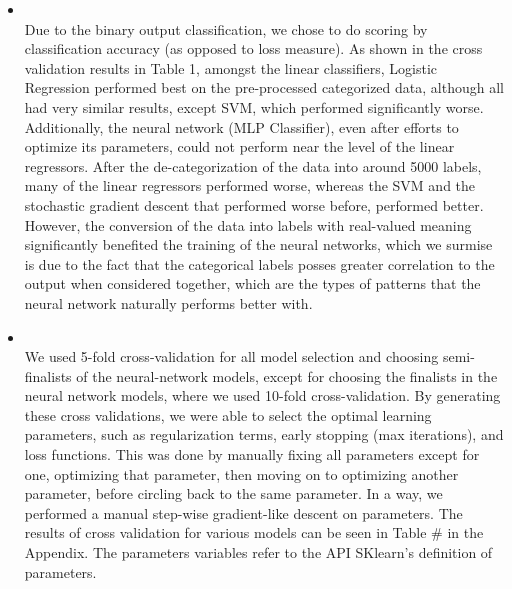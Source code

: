 \begin{itemize}

    \item {} \\
    Due to the binary output classification, we chose to do scoring by classification accuracy (as opposed to loss measure). As shown in the cross validation results in Table 1, amongst the linear classifiers, Logistic Regression performed best on the pre-processed categorized data, although all had very similar results, except SVM, which performed significantly worse. Additionally, the neural network (MLP Classifier), even after efforts to optimize its parameters, could not perform near the level of the linear regressors. After the de-categorization of the data into around 5000 labels, many of the linear regressors performed worse, whereas the SVM and the stochastic gradient descent that performed worse before, performed better. However, the conversion of the data into labels with real-valued meaning significantly benefited the training of the neural networks, which we surmise is due to the fact that the categorical labels posses greater correlation to the output when considered together, which are the types of patterns that the neural network naturally performs better with.

    \item {} \\
    We used 5-fold cross-validation for all model selection and choosing semi-finalists of the neural-network models, except for choosing the finalists in the neural network models, where we used 10-fold cross-validation.  By generating these cross validations, we were able to select the optimal learning parameters, such as regularization terms, early stopping (max iterations), and loss functions. This was done by manually fixing all parameters except for one, optimizing that parameter, then moving on to optimizing another parameter, before circling back to the same parameter. In a way, we performed a manual step-wise gradient-like descent on parameters. The results of cross validation for various models can be seen in Table \# in the Appendix. The parameters variables refer to the API SKlearn's definition of parameters.

\end{itemize}



